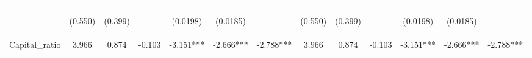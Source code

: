 \documentclass[]{article}
\begin{document}
\begin{center}
\begin{tabular}{lcccccccccccc}
\vspace{4pt} & \begin{footnotesize}(0.550)\end{footnotesize} & \begin{footnotesize}(0.399)\end{footnotesize} & \begin{footnotesize}\end{footnotesize} & \begin{footnotesize}(0.0198)\end{footnotesize} & \begin{footnotesize}(0.0185)\end{footnotesize} & \begin{footnotesize}\end{footnotesize} & \begin{footnotesize}(0.550)\end{footnotesize} & \begin{footnotesize}(0.399)\end{footnotesize} & \begin{footnotesize}\end{footnotesize} & \begin{footnotesize}(0.0198)\end{footnotesize} & \begin{footnotesize}(0.0185)\end{footnotesize} & \begin{footnotesize}\end{footnotesize} \\
Capital\_ratio & 3.966 & 0.874 & -0.103 & -3.151*** & -2.666*** & -2.788*** & 3.966 & 0.874 & -0.103 & -3.151*** & -2.666*** & -2.788*** \\

\end{tabular}
\end{center}
\end{document}
